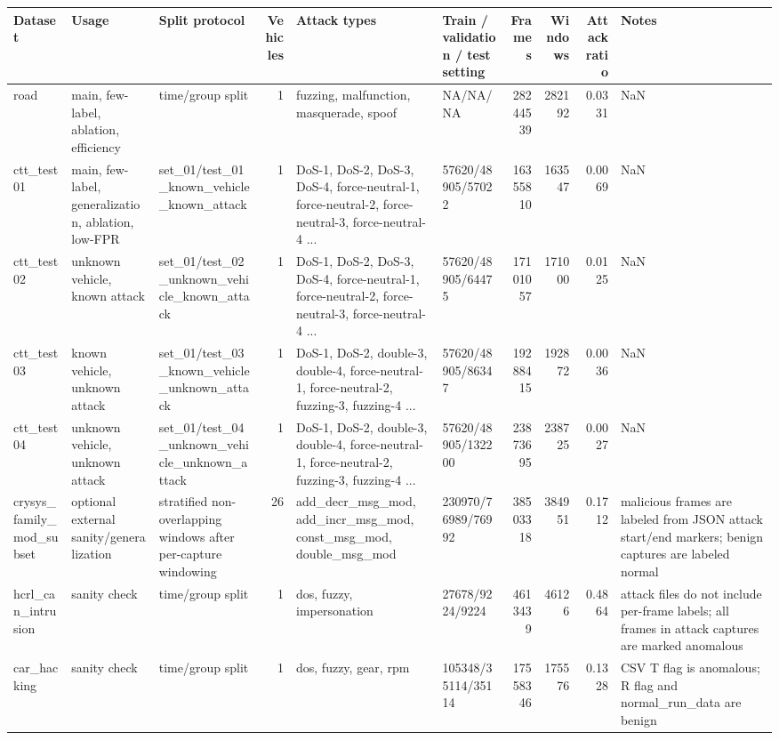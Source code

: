 \begin{tabular}{lllrllrrrl}
\toprule
Dataset & Usage & Split protocol & Vehicles & Attack types & Train / validation / test setting & Frames & Windows & Attack ratio & Notes \\
\midrule
road & main, few-label, ablation, efficiency & time/group split & 1 & fuzzing, malfunction, masquerade, spoof & NA/NA/NA & 28244539 & 282192 & 0.0331 & NaN \\
ctt_test01 & main, few-label, generalization, ablation, low-FPR & set_01/test_01_known_vehicle_known_attack & 1 & DoS-1, DoS-2, DoS-3, DoS-4, force-neutral-1, force-neutral-2, force-neutral-3, force-neutral-4 ... & 57620/48905/57022 & 16355810 & 163547 & 0.0069 & NaN \\
ctt_test02 & unknown vehicle, known attack & set_01/test_02_unknown_vehicle_known_attack & 1 & DoS-1, DoS-2, DoS-3, DoS-4, force-neutral-1, force-neutral-2, force-neutral-3, force-neutral-4 ... & 57620/48905/64475 & 17101057 & 171000 & 0.0125 & NaN \\
ctt_test03 & known vehicle, unknown attack & set_01/test_03_known_vehicle_unknown_attack & 1 & DoS-1, DoS-2, double-3, double-4, force-neutral-1, force-neutral-2, fuzzing-3, fuzzing-4 ... & 57620/48905/86347 & 19288415 & 192872 & 0.0036 & NaN \\
ctt_test04 & unknown vehicle, unknown attack & set_01/test_04_unknown_vehicle_unknown_attack & 1 & DoS-1, DoS-2, double-3, double-4, force-neutral-1, force-neutral-2, fuzzing-3, fuzzing-4 ... & 57620/48905/132200 & 23873695 & 238725 & 0.0027 & NaN \\
crysys_family_mod_subset & optional external sanity/generalization & stratified non-overlapping windows after per-capture windowing & 26 & add_decr_msg_mod, add_incr_msg_mod, const_msg_mod, double_msg_mod & 230970/76989/76992 & 38503318 & 384951 & 0.1712 & malicious frames are labeled from JSON attack start/end markers; benign captures are labeled normal \\
hcrl_can_intrusion & sanity check & time/group split & 1 & dos, fuzzy, impersonation & 27678/9224/9224 & 4613439 & 46126 & 0.4864 & attack files do not include per-frame labels; all frames in attack captures are marked anomalous \\
car_hacking & sanity check & time/group split & 1 & dos, fuzzy, gear, rpm & 105348/35114/35114 & 17558346 & 175576 & 0.1328 & CSV T flag is anomalous; R flag and normal_run_data are benign \\
\bottomrule
\end{tabular}
